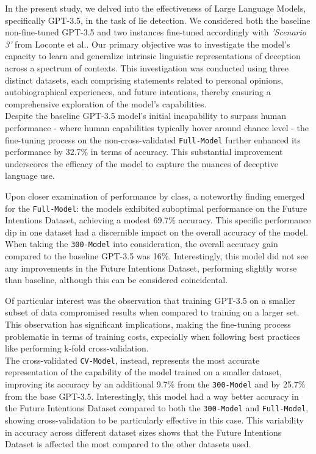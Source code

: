 \documentclass[10pt,twocolumn,letterpaper]{article}
\begin{document}
In the present study, we delved into the effectiveness of Large Language Models, specifically GPT-3.5, in the task of lie detection.
We considered both the baseline non-fine-tuned GPT-3.5 and two instances fine-tuned accordingly with \textit{'Scenario 3'} from Loconte et al.\cite{Loconte}. 
Our primary objective was to investigate the model's capacity to learn and generalize intrinsic linguistic representations of deception 
across a spectrum of contexts. This investigation was conducted using three distinct datasets, each comprising 
statements related to personal opinions, autobiographical experiences, and future intentions, thereby ensuring 
a comprehensive exploration of the model's capabilities. \\

Despite the baseline GPT-3.5 model's initial incapability to surpass human performance - where human capabilities 
typically hover around chance level - the fine-tuning process on the non-cross-validated \texttt{Full-Model} further enhanced its performance by 32.7\% in terms 
of accuracy.
This substantial improvement underscores the efficacy of the model to capture the nuances of deceptive language use.

Upon closer examination of performance by class, a noteworthy finding emerged for the \texttt{Full-Model}: the models exhibited 
suboptimal performance on the Future Intentions Dataset, achieving a modest 69.7\% accuracy. 
This specific performance dip in one dataset had a discernible impact on the overall accuracy of the model. \\

When taking the \texttt{300-Model} into consideration, the overall accuracy gain compared to the baseline GPT-3.5 was 16\%. 
Interestingly, this model did not see any improvements in the Future Intentions Dataset, performing slightly worse than baseline,
although this can be considered coincidental.

Of particular interest was the observation that training GPT-3.5 on a smaller subset of data compromised
results when compared to training on a larger set. This observation has significant 
implications, making the fine-tuning process problematic in terms of training costs, 
expecially when following best practices like performing k-fold cross-validation. \\

The cross-validated \texttt{CV-Model}, instead, represents the most accurate representation of the capability of the model trained
on a smaller dataset, improving its accuracy by an additional 9.7\% from the \texttt{300-Model} and by 25.7\% from the base GPT-3.5. Interestingly, this model had a way better accuracy
in the Future Intentions Dataset compared to both the \texttt{300-Model} and \texttt{Full-Model}, showing cross-validation to be particularly
effective in this case. This variability in accuracy across different dataset sizes shows that the Future Intentions Dataset is affected the 
most compared to the other datasets used. \\
\end{document}
